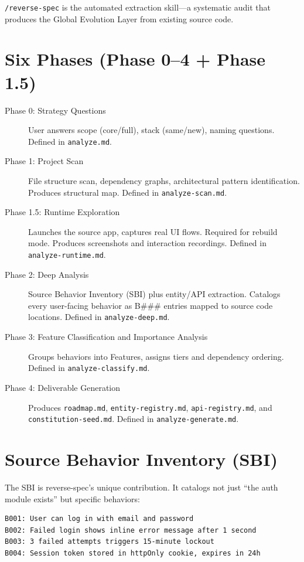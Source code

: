 \documentclass[11pt,a4paper,openright,twoside]{report}
\newcommand{\cmd}[1]{\texttt{/#1}}
\newcommand{\file}[1]{\texttt{#1}}
\begin{document}
\cmd{reverse-spec} is the automated extraction skill---a systematic audit that produces the Global Evolution Layer from existing source code.

\section{Six Phases (Phase 0--4 + Phase 1.5)}

\begin{description}
  \item[Phase 0: Strategy Questions] User answers scope (core/full), stack (same/new), naming questions. Defined in \file{analyze.md}.
  \item[Phase 1: Project Scan] File structure scan, dependency graphs, architectural pattern identification. Produces structural map. Defined in \file{analyze-scan.md}.
  \item[Phase 1.5: Runtime Exploration] Launches the source app, captures real UI flows. Required for rebuild mode. Produces screenshots and interaction recordings. Defined in \file{analyze-runtime.md}.
  \item[Phase 2: Deep Analysis] Source Behavior Inventory (SBI) plus entity/API extraction. Catalogs every user-facing behavior as B\#\#\# entries mapped to source code locations. Defined in \file{analyze-deep.md}.
  \item[Phase 3: Feature Classification and Importance Analysis] Groups behaviors into Features, assigns tiers and dependency ordering. Defined in \file{analyze-classify.md}.
  \item[Phase 4: Deliverable Generation] Produces \file{roadmap.md}, \file{entity-registry.md}, \file{api-registry.md}, and \file{constitution-seed.md}. Defined in \file{analyze-generate.md}.
\end{description}

\section{Source Behavior Inventory (SBI)}

The SBI is reverse-spec's unique contribution. It catalogs not just ``the auth module exists'' but specific behaviors:

\begin{lstlisting}[title={SBI Example}]
B001: User can log in with email and password
B002: Failed login shows inline error message after 1 second
B003: 3 failed attempts triggers 15-minute lockout
B004: Session token stored in httpOnly cookie, expires in 24h
\end{lstlisting}
\end{document}
